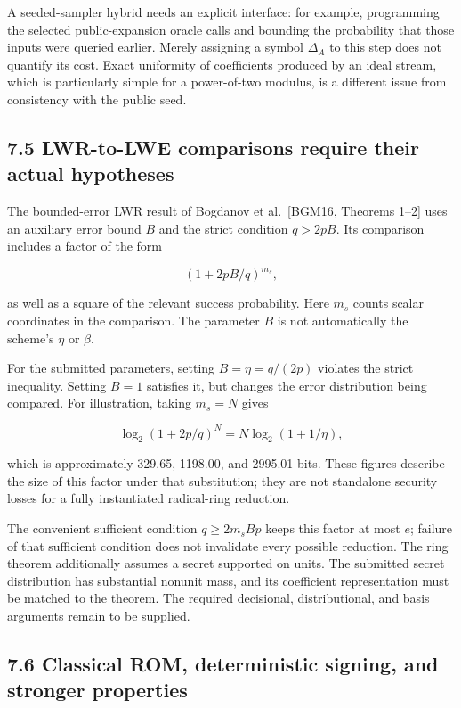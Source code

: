 \documentclass[
  american,
  10pt,
  a4paper,
]{article}
\begin{document}
A seeded-sampler hybrid needs an explicit interface: for example,
programming the selected public-expansion oracle calls and bounding the
probability that those inputs were queried earlier. Merely assigning a
symbol \(\Delta_A\) to this step does not quantify its cost. Exact
uniformity of coefficients produced by an ideal stream, which is
particularly simple for a power-of-two modulus, is a different issue
from consistency with the public seed.

\subsection{7.5 LWR-to-LWE comparisons require their actual
hypotheses}\label{lwr-to-lwe-comparisons-require-their-actual-hypotheses}

The bounded-error LWR result of Bogdanov et al.~{[}BGM16, Theorems
1--2{]} uses an auxiliary error bound \(B\) and the strict condition
\(q>2pB\). Its comparison includes a factor of the form

\[
(1+2pB/q)^{m_s},
\]

as well as a square of the relevant success probability. Here \(m_s\)
counts scalar coordinates in the comparison. The parameter \(B\) is not
automatically the scheme's \(\eta\) or \(\beta\).

For the submitted parameters, setting \(B=\eta=q/(2p)\) violates the
strict inequality. Setting \(B=1\) satisfies it, but changes the error
distribution being compared. For illustration, taking \(m_s=N\) gives

\[
\log_2(1+2p/q)^N=N\log_2(1+1/\eta),
\]

which is approximately 329.65, 1198.00, and 2995.01 bits. These figures
describe the size of this factor under that substitution; they are not
standalone security losses for a fully instantiated radical-ring
reduction.

The convenient sufficient condition \(q\geq2m_sBp\) keeps this factor at
most \(e\); failure of that sufficient condition does not invalidate
every possible reduction. The ring theorem additionally assumes a secret
supported on units. The submitted secret distribution has substantial
nonunit mass, and its coefficient representation must be matched to the
theorem. The required decisional, distributional, and basis arguments
remain to be supplied.

\subsection{7.6 Classical ROM, deterministic signing, and stronger
properties}\label{classical-rom-deterministic-signing-and-stronger-properties}
\end{document}
